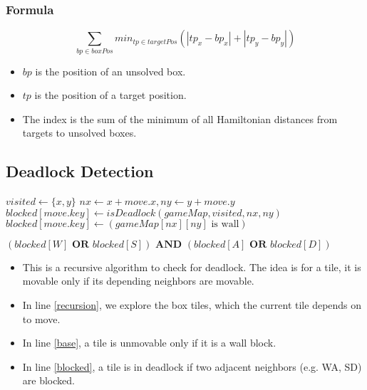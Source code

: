 \documentclass[a4paper, 10pt]{article}
\begin{document}
            \subsubsection{Formula}
                \begin{equation*}
                    \sum_{bp \in boxPos} min_{tp \in targetPos} (|tp_x - bp_x| + |tp_y - bp_y|)
                \end{equation*}

                \begin{itemize}
                    \item $bp$ is the position of an unsolved box.
                    \item $tp$ is the position of a target position.
                    \item The index is the sum of the minimum of all Hamiltonian distances 
                        from targets to unsolved boxes.
                \end{itemize}

        \subsection{Deadlock Detection}
            \begin{algorithmic}[1]
                    \State $visited \gets \{x, y\}$
                        \State $nx \gets x + move.x, ny \gets y + move.y$
                            \State $blocked[move.key] \gets isDeadlock(gameMap, visited, nx, ny)$ \label{recursion}
                        \Else
                            \State $blocked[move.key] \gets (gameMap[nx][ny] \text{ is wall})$ \label{base}
                        \EndIf
                    \EndFor

                    \State \Return $(blocked[W] \textbf{ OR } blocked[S]) \textbf{ AND } 
                        (blocked[A] \textbf{ OR } blocked[D])$ \label{blocked}
                \EndFunction
            \end{algorithmic}

            \begin{itemize}
                \item This is a recursive algorithm to check for deadlock. 
                    The idea is for a tile, it is movable only if its depending neighbors are movable.
                \item In line \ref{recursion}, we explore the box tiles, which the current tile depends on to move.
                \item In line \ref{base}, a tile is unmovable only if it is a wall block.
                \item In line \ref{blocked}, a tile is in deadlock if two adjacent neighbors (e.g. WA, SD) are blocked.
            \end{itemize}
        
\end{document}
